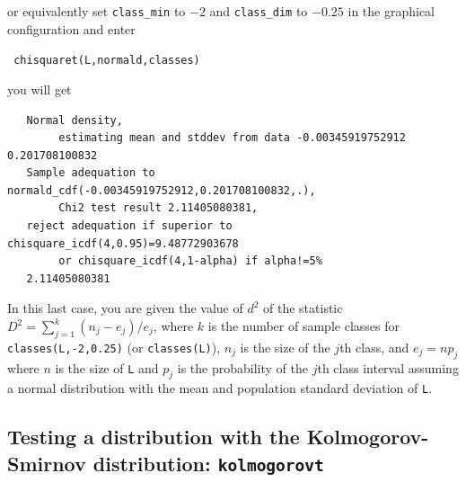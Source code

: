 \documentclass[a4paper,11pt]{book}
\begin{document}
or equivalently set \texttt{class\_min} to $-2$ and
\texttt{class\_dim} to $-0.25$ in the graphical configuration and enter
\begin{center}
  \tt
  chisquaret(L,normald,classes)  
\end{center}
you will get
\begin{verbatim}
   Normal density, 
        estimating mean and stddev from data -0.00345919752912 0.201708100832
   Sample adequation to normald_cdf(-0.00345919752912,0.201708100832,.), 
        Chi2 test result 2.11405080381,
   reject adequation if superior to chisquare_icdf(4,0.95)=9.48772903678
        or chisquare_icdf(4,1-alpha) if alpha!=5%
   2.11405080381
\end{verbatim}
In this last case, you are given the value of $d^2$ of the statistic 
$D^2 = \sum_{j=1}^{k} (n_j - e_j)/e_j$, where $k$ is the number of
sample classes for \texttt{classes(L,-2,0.25)} (or
\texttt{classes(L)}), $n_j$ is the size of the $j$th class, and $e_j =
n p_j$ where $n$ is the size of \texttt{L} and $p_j$ is the
probability of the $j$th class interval assuming a normal distribution
with the mean and population standard deviation of \texttt{L}.

\subsection{Testing a distribution with the Kolmogorov-Smirnov
distribution: \texttt{kolmogorovt}}
\end{document}
